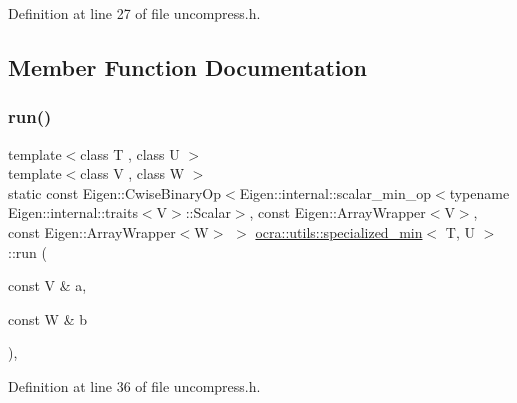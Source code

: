 Definition at line 27 of file uncompress.\+h.



\subsection{Member Function Documentation}
\hypertarget{structocra_1_1utils_1_1specialized__min_a8ccdfb97b3ade7ea2043fd608c8bade5}{}\label{structocra_1_1utils_1_1specialized__min_a8ccdfb97b3ade7ea2043fd608c8bade5} 
\subsubsection{\texorpdfstring{run()}{run()}\hspace{0.1cm}{\footnotesize\ttfamily [1/2]}}
{\footnotesize\ttfamily template$<$class T , class U $>$ \\
template$<$class V , class W $>$ \\
static const Eigen\+::\+Cwise\+Binary\+Op$<$Eigen\+::internal\+::scalar\+\_\+min\+\_\+op$<$typename Eigen\+::internal\+::traits$<$V$>$\+::Scalar$>$, const Eigen\+::\+Array\+Wrapper$<$V$>$, const Eigen\+::\+Array\+Wrapper$<$W$>$ $>$ \hyperlink{structocra_1_1utils_1_1specialized__min}{ocra\+::utils\+::specialized\+\_\+min}$<$ T, U $>$\+::run (\begin{DoxyParamCaption}\item[{const V \&}]{a,  }\item[{const W \&}]{b }\end{DoxyParamCaption})\hspace{0.3cm}{\ttfamily [inline]}, {\ttfamily [static]}}



Definition at line 36 of file uncompress.\+h.

\hypertarget{structocra_1_1utils_1_1specialized__min_aeb9da860eb661e340840d81bc5b5202a}{}\label{structocra_1_1utils_1_1specialized__min_aeb9da860eb661e340840d81bc5b5202a} 

